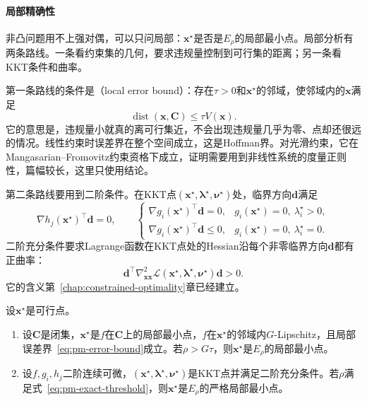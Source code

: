 \paragraph{局部精确性}
非凸问题用不上强对偶，可以只问局部：$\bm{x}^\star$是否是$E_\rho$的局部最小点。局部分析有两条路线。一条看约束集的几何，要求违规量控制到可行集的距离；另一条看KKT条件和曲率。

第一条路线的条件是（local error bound）：存在$\tau>0$和$\bm{x}^\star$的邻域，使邻域内的$\bm{x}$满足
\begin{equation}
 \operatorname{dist}(\bm{x},\bm{C})\leq\tau V(\bm{x}).
 \label{eq:pm-error-bound}
\end{equation}
它的意思是，违规量小就真的离可行集近，不会出现违规量几乎为零、点却还很远的情况。线性约束时误差界在整个空间成立，这是Hoffman界。对光滑约束，它在Mangasarian--Fromovitz约束资格下成立，证明需要用到非线性系统的度量正则性，篇幅较长，这里只使用结论。

第二条路线要用到二阶条件。在KKT点$(\bm{x}^\star,\bm{\lambda}^\star,\bm{\nu}^\star)$处，临界方向$\bm{d}$满足
\begin{equation}
 \nabla h_j(\bm{x}^\star)^\top\bm{d}=0,\qquad
 \begin{cases}
 \nabla g_i(\bm{x}^\star)^\top\bm{d}=0, & g_i(\bm{x}^\star)=0,\ \lambda_i^\star>0,\\
 \nabla g_i(\bm{x}^\star)^\top\bm{d}\leq0, & g_i(\bm{x}^\star)=0,\ \lambda_i^\star=0.
 \end{cases}
 \label{eq:pm-critical-cone}
\end{equation}
二阶充分条件要求Lagrange函数在KKT点处的Hessian沿每个非零临界方向$\bm{d}$都有正曲率：
\[
 \bm{d}^\top\nabla^2_{\bm{x}\bm{x}}\mathcal{L}(\bm{x}^\star,\bm{\lambda}^\star,\bm{\nu}^\star)\bm{d}>0 .
\]
它的含义第~\ref{chap:constrained-optimality}章已经建立。

\begin{theorem}[一次罚的局部精确性]
\label{thm:pm-exact-local}
设$\bm{x}^\star$是可行点。
\begin{enumerate}
 \item 设$\bm{C}$是闭集，$\bm{x}^\star$是$f$在$\bm{C}$上的局部最小点，$f$在$\bm{x}^\star$的邻域内$G$-Lipschitz，且局部误差界~\eqref{eq:pm-error-bound}成立。若$\rho>G\tau$，则$\bm{x}^\star$是$E_\rho$的局部最小点。
 \item 设$f,g_i,h_j$二阶连续可微，$(\bm{x}^\star,\bm{\lambda}^\star,\bm{\nu}^\star)$是KKT点并满足二阶充分条件。若$\rho$满足式~\eqref{eq:pm-exact-threshold}，则$\bm{x}^\star$是$E_\rho$的严格局部最小点。
\end{enumerate}
\end{theorem}

